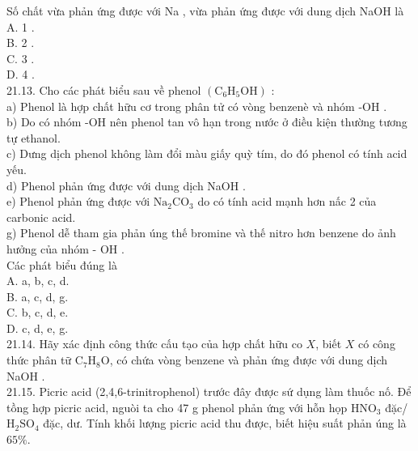 \documentclass[10pt]{article}
\begin{document}
Số chất vừa phản ứng được với Na , vừa phản ứng được với dung dịch NaOH là\\
A. 1 .\\
B. 2 .\\
C. 3 .\\
D. 4 .\\
21.13. Cho các phát biểu sau về phenol $\left(\mathrm{C}_{6} \mathrm{H}_{5} \mathrm{OH}\right)$ :\\
a) Phenol là hợp chất hữu cơ trong phân tử có vòng benzenè và nhóm -OH .\\
b) Do có nhóm -OH nên phenol tan vô hạn trong nước ở điều kiện thường tương tự ethanol.\\
c) Dưng dịch phenol không làm đổi màu giấy quỳ tím, do đó phenol có tính acid yếu.\\
d) Phenol phản ứng được với dung dịch NaOH .\\
e) Phenol phản ứng được với $\mathrm{Na}_{2} \mathrm{CO}_{3}$ do có tính acid mạnh hơn nấc 2 của carbonic acid.\\
g) Phenol dễ tham gia phản úng thế bromine và thế nitro hơn benzene do ảnh hưởng của nhóm - OH .\\
Các phát biểu đúng là\\
A. a, b, c, d.\\
B. a, c, d, g.\\
C. b, c, d, e.\\
D. c, d, e, g.\\
21.14. Hãy xác định công thức cấu tạo của hợp chất hữu co $X$, biết $X$ có công thức phân tữ $\mathrm{C}_{7} \mathrm{H}_{8} \mathrm{O}$, có chứa vòng benzene và phản ứng được với dung dịch NaOH .\\
21.15. Picric acid (2,4,6-trinitrophenol) trước đây được sứ dụng làm thuốc nố. Để tồng hợp picric acid, nguòi ta cho 47 g phenol phản ứng với hỗn họp $\mathrm{HNO}_{3}$ đặc/ $\mathrm{H}_{2} \mathrm{SO}_{4}$ đặc, dư. Tính khối lượng picric acid thu được, biết hiệu suất phản úng là $65 \%$.
\end{document}
